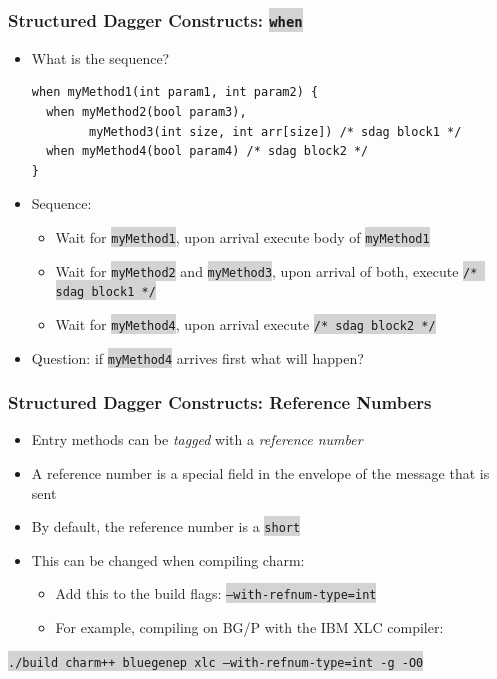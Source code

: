 \documentclass{beamer}
\newcommand{\code}[1]{\colorbox{lightgray}{\texttt{#1}}}
\begin{document}
\begin{frame}[fragile]
  \frametitle{Structured Dagger Constructs: \code{when}}
\begin{itemize}
  \item What is the sequence?
  \begin{lstlisting}[basicstyle=\scriptsize]
when myMethod1(int param1, int param2) {
  when myMethod2(bool param3),
        myMethod3(int size, int arr[size]) /* sdag block1 */
  when myMethod4(bool param4) /* sdag block2 */
}
  \end{lstlisting}
  \pause
  \item Sequence:
    \begin{itemize}
      \item Wait for \code{myMethod1}, upon arrival execute body of \code{myMethod1}
        \pause
      \item Wait for \code{myMethod2} and \code{myMethod3}, upon arrival of
        both, execute \code{/* sdag block1 */}
        \pause
      \item Wait for \code{myMethod4}, upon arrival execute \code{/* sdag block2 */}
    \end{itemize}
  \item Question: if \code{myMethod4} arrives first what will happen?
\end{itemize}

\end{frame}

\begin{frame}[fragile]
  \frametitle{Structured Dagger Constructs: Reference Numbers}
  \begin{itemize}
    \item Entry methods can be \emph{tagged} with a \emph{reference number}
    \item A reference number is a special field in the envelope of the message
      that is sent
    \item By default, the reference number is a \code{short}
    \item This can be changed when compiling charm:
      \begin{itemize}
      \item Add this to the build flags:
        \code{--with-refnum-type=int}
      \item For example, compiling on BG/P with the IBM XLC compiler:

      \end{itemize}
  \end{itemize}
\code{./build charm++ bluegenep xlc --with-refnum-type=int -g -O0}

\end{frame}
\end{document}
